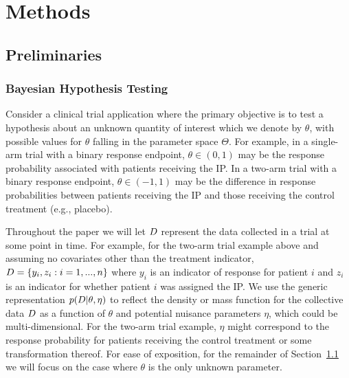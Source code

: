 \documentclass[AMA,STIX1COL,doublespace]{WileyNJD-v2}
\begin{document}
\section{Methods}\label{sec:methods}

\subsection{Preliminaries}\label{sec:preliminaries}
\subsubsection{Bayesian Hypothesis Testing}
Consider a clinical trial application where the primary objective is to test a hypothesis about an unknown quantity of interest which we denote by $\theta$, with possible values
for $\theta$ falling in the parameter space $\Theta$.
%
For example, in a single-arm trial with a binary response endpoint, $\theta \in (0,1)$ may be the response probability associated with patients receiving the IP.
%
In a two-arm trial with a binary response endpoint, $\theta \in (-1,1)$ may be the difference in response probabilities between patients receiving the IP and those receiving the control treatment (e.g., placebo).

Throughout the paper we will let $\boldmath{D}$ represent the data collected in a trial at some point in time. 
%
For example, for the two-arm trial example above and assuming no covariates other than the treatment indicator, $\boldmath{D}=\left\{y_i,z_i:i=1,...,n\right\}$ where $y_i$ is an indicator of response for patient $i$ and $z_i$ is an indicator for whether patient $i$ was assigned the IP.
%
We use the generic representation $p(\boldmath{D}|\theta,\eta)$ to reflect the density or mass function for the collective data $\boldmath{D}$ as 
a function of $\theta$ and potential nuisance parameters $\eta$, which could be multi-dimensional.
%
For the two-arm trial example, $\eta$ might correspond to the response probability for patients receiving the control treatment or some transformation thereof. 
For ease of exposition, for the remainder of Section~\ref{sec:preliminaries} we will focus on the case where $\theta$ is the only unknown parameter.
\end{document}
